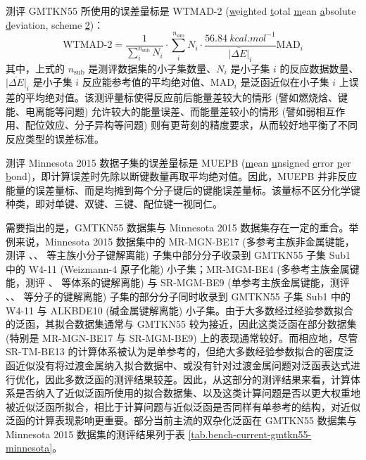 测评 GMTKN55 所使用的误差量标是 WTMAD-2 (\underline{w}eighted \underline{t}otal \underline{m}ean \underline{a}bsolute \underline{d}eviation, scheme \underline{2})：
\begin{equation}
  \text{WTMAD-2} = \frac{1}{\sum_{i}^{n_\mathrm{sub}} N_i} \cdot \sum_{i}^{n_\mathrm{sub}} N_i \cdot \frac{\SI{56.84}{kcal.mol^{-1}}}{\overline{|\Delta E|}_i} \text{MAD}_i
\end{equation}
其中，上式的 $n_\mathrm{sub}$ 是测评数据集的小子集数量、$N_i$ 是小子集 $i$ 的反应数据数量、$\overline{|\Delta E|}_i$ 是小子集 $i$ 反应能参考值的平均绝对值、$\text{MAD}_i$ 是泛函近似在小子集 $i$ 上误差的平均绝对值。该测评量标使得反应前后能量差较大的情形 (譬如燃烧焓、键能、电离能等问题) 允许较大的能量误差、而能量差较小的情形 (譬如弱相互作用、配位效应、分子异构等问题) 则有更苛刻的精度要求，从而较好地平衡了不同反应类型的误差标准。

测评 Minnesota 2015 数据子集的误差量标是 MUEPB (\underline{m}ean \underline{u}nsigned \underline{e}rror \underline{p}er \underline{b}ond)，即计算误差时先除以断键数量再取平均绝对值。因此，MUEPB 并非反应能量的误差量标、而是均摊到每个分子键后的键能误差量标。该量标不区分化学键种类，即对单键、双键、三键、配位键一视同仁。

需要指出的是，GMTKN55 数据集与 Minnesota 2015 数据集存在一定的重合。举例来说，Minnesota 2015 数据集中的 MR-MGN-BE17 (多参考主族非金属键能，测评 、、 等主族小分子键解离能) 子集中部分分子收录到 GMTKN55 子集 Sub1 中的 W4-11 (Weizmann-4 原子化能) 小子集；MR-MGM-BE4 (多参考主族金属键能，测评 、 等体系的键解离能) 与 SR-MGM-BE9 (单参考主族金属键能，测评 、、 等分子的键解离能) 子集的部分分子同时收录到 GMTKN55 子集 Sub1 中的 W4-11 与 ALKBDE10 (碱金属键解离能) 小子集。由于大多数经过经验参数拟合的泛函，其拟合数据集通常与 GMTKN55 较为接近，因此这类泛函在部分数据集 (特别是 MR-MGN-BE17 与 SR-MGM-BE9) 上的表现通常较好。而相应地，尽管 SR-TM-BE13 的计算体系被认为是单参考的，但绝大多数经验参数拟合的密度泛函近似没有将过渡金属纳入拟合数据中、或没有针对过渡金属问题对泛函表达式进行优化，因此多数泛函的测评结果较差。因此，从这部分的测评结果来看，计算体系是否纳入了近似泛函所使用的拟合数据集、以及这类计算问题是否以更大权重地被近似泛函所拟合，相比于计算问题与近似泛函是否同样有单参考的结构，对近似泛函的计算表现影响更重要。部分当前主流的双杂化泛函在 GMTKN55 数据集与 Minnesota 2015 数据集的测评结果列于表 \ref{tab.bench-current-gmtkn55-minnesota}。

